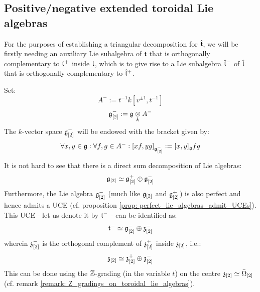     \subsection{Positive/negative extended toroidal Lie algebras}
        For the purposes of establishing a triangular decomposition for $\hat{\mathfrak{t}}$, we will be firstly needing an auxiliary Lie subalgebra of $\mathfrak{t}$ that is orthogonally complementary to $\mathfrak{t}^+$ inside $\mathfrak{t}$, which is to give rise to a Lie subalgebra $\hat{\mathfrak{t}}^-$ of $\hat{\mathfrak{t}}$ that is orthogonally complementary to $\hat{\mathfrak{t}}^+$.
        \begin{convention}
            Set:
                $$A^- := t^{-1} k[v^{\pm 1}, t^{-1}]$$
                $$\g_{[2]}^- := \g \tensor_k A^-$$
            The $k$-vector space $\mathfrak{g}_{[2]}^-$ will be endowed with the bracket given by:
                $$\forall x, y \in \mathfrak{g}: \forall f, g \in A^-: [x f, y g]_{\mathfrak{g}_{[2]}^-} := [x, y]_{\mathfrak{g}} fg$$
        \end{convention}
        It is not hard to see that there is a direct sum decomposition of Lie algebras:
            $$\mathfrak{g}_{[2]} \simeq \mathfrak{g}_{[2]}^+ \oplus \mathfrak{g}_{[2]}^-$$
        Furthermore, the Lie algebra $\mathfrak{g}_{[2]}^-$ (much like $\mathfrak{g}_{[2]}$ and $\mathfrak{g}_{[2]}^+$) is also perfect and hence admits a UCE (cf. proposition \ref{prop: perfect_lie_algebras_admit_UCEs}). This UCE - let us denote it by $\mathfrak{t}^-$ - can be identified as:
            $$\mathfrak{t}^- \simeq \mathfrak{g}_{[2]}^- \oplus \mathfrak{z}_{[2]}^-$$
        wherein $\mathfrak{z}_{[2]}^-$ is the orthogonal complement of $\mathfrak{z}_{[2]}^+$ inside $\mathfrak{z}_{[2]}$, i.e.:
            $$\mathfrak{z}_{[2]} \simeq \mathfrak{z}_{[2]}^+ \oplus \mathfrak{z}_{[2]}^-$$
        This can be done using the $\mathbb{Z}$-grading (in the variable $t$) on the centre $\mathfrak{z}_{[2]} \simeq \bar{\Omega}_{[2]}$ (cf. remark \ref{remark: Z_gradings_on_toroidal_lie_algebras}).
        
